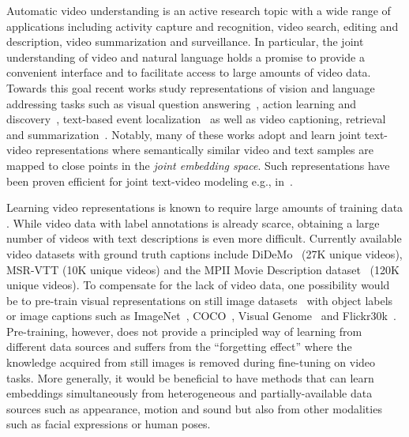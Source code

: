 \documentclass[runningheads]{llncs}
\begin{document}
Automatic video understanding is an active research topic with a wide range of applications including activity capture and recognition, video search, editing and description, video summarization and surveillance.
In particular, the joint understanding of video and natural language holds a promise to provide a convenient interface and to facilitate access to large amounts of video data.
Towards this goal recent works study representations of vision and language addressing tasks such as visual question answering~\cite{tapaswi16movieqa,yu17endtoend}, action learning and discovery~\cite{miech17learning,bojanowski15weakly,alayrac16unsupervised}, text-based event localization~\cite{hendricks17localizing} as well as video captioning, retrieval and summarization~\cite{pan16jointly,plummer2017enhancing,xu2015jointly,yu2016video}.
Notably, many of these works adopt and learn joint text-video representations where semantically similar video and text samples are mapped to close points in the {\em joint embedding space}.
Such representations have been proven efficient for joint text-video modeling e.g., in~\cite{pan16jointly,plummer2017enhancing,xu2015jointly,bojanowski15weakly,hendricks17localizing}.


Learning video representations is known to require large amounts of training data \cite{tran15c3d,carreira2017quovadis}.
While video data with label annotations is already scarce, obtaining a large number of videos with text descriptions is even more difficult.
Currently available video datasets with ground truth captions include DiDeMo~\cite{hendricks17localizing} (27K unique videos), MSR-VTT\cite{xu16msrvtt} (10K unique videos) and the MPII Movie Description dataset~\cite{rohrbach15dataset} (120K unique videos).
To compensate for the lack of video data, one possibility would be to pre-train visual representations on still image datasets~\cite{carreira2017quovadis} with object labels or image captions such as ImageNet~\cite{deng2009imagenet}, COCO~\cite{lin14coco}, Visual Genome~\cite{visualgenome} and Flickr30k~\cite{plummer2015flickr30k}. Pre-training, however, does not provide a principled way of learning from different data sources and suffers from the ``forgetting effect'' where the knowledge acquired from still images is removed during fine-tuning on video tasks. More generally, it would be beneficial to have methods that can learn embeddings simultaneously from heterogeneous and partially-available data sources such as appearance, motion and sound but also from other modalities such as facial expressions or human poses.
\end{document}
